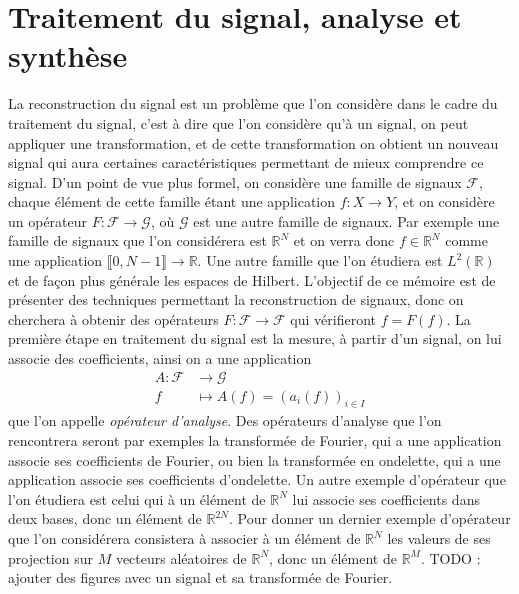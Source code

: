 \section{Traitement du signal, analyse et synthèse}
La reconstruction du signal est un problème que l'on considère dans le cadre du traitement du signal, c'est à dire que l'on considère qu'à un signal, on peut appliquer une transformation, et de cette transformation on obtient un nouveau signal qui aura certaines caractéristiques permettant de mieux comprendre ce signal.
D'un point de vue plus formel, on considère une famille de signaux $\mathcal{F}$, chaque élément de cette famille étant une application $f : X \longrightarrow Y$, et on considère un opérateur $F : \mathcal{F} \longrightarrow \mathcal{G}$, où $\mathcal{G}$ est une autre famille de signaux.
\newline
Par exemple une famille de signaux que l'on considérera est $\mathbb{R}^N$ et on verra donc $f\in \mathbb{R}^N$ comme une application $\llbracket 0,N-1 \rrbracket \rightarrow \mathbb{R}$.
Une autre famille que l'on étudiera est $L^2(\mathbb{R})$ et de façon plus générale les espaces de Hilbert. 
\newline
L'objectif de ce mémoire est de présenter des techniques permettant la reconstruction de signaux, donc on cherchera à obtenir des opérateurs $F	:\mathcal{F} \rightarrow \mathcal{F}$ qui vérifieront $f=F(f)$. 
La première étape en traitement du signal est la mesure, à partir d'un signal, on lui associe des coefficients, ainsi on a une application
\begin{align}
	A : 	\mathcal{F} &\longrightarrow \mathcal{G} \\
		f &\longmapsto A(f) = (a_i(f))_{i\in I}
\end{align}
que l'on appelle \emph{opérateur d'analyse}.
\newline
Des opérateurs d'analyse que l'on rencontrera seront par exemples la transformée de Fourier, qui a une application associe ses coefficients de Fourier, ou bien la transformée en ondelette, qui a une application associe ses coefficients d'ondelette.
Un autre exemple d'opérateur que l'on étudiera est celui qui à un élément de $\mathbb{R}^N$ lui associe ses coefficients dans deux bases, donc un élément de $\mathbb{R}^{2N}$.
Pour donner un dernier exemple d'opérateur que l'on considérera consistera à associer à un élément de $\mathbb{R}^N$ les valeurs de ses projection sur $M$ vecteurs aléatoires de $\mathbb{R}^N$, donc un élément de $\mathbb{R}^M$.
\newline 
TODO : ajouter des figures avec un signal et sa transformée de Fourier.

